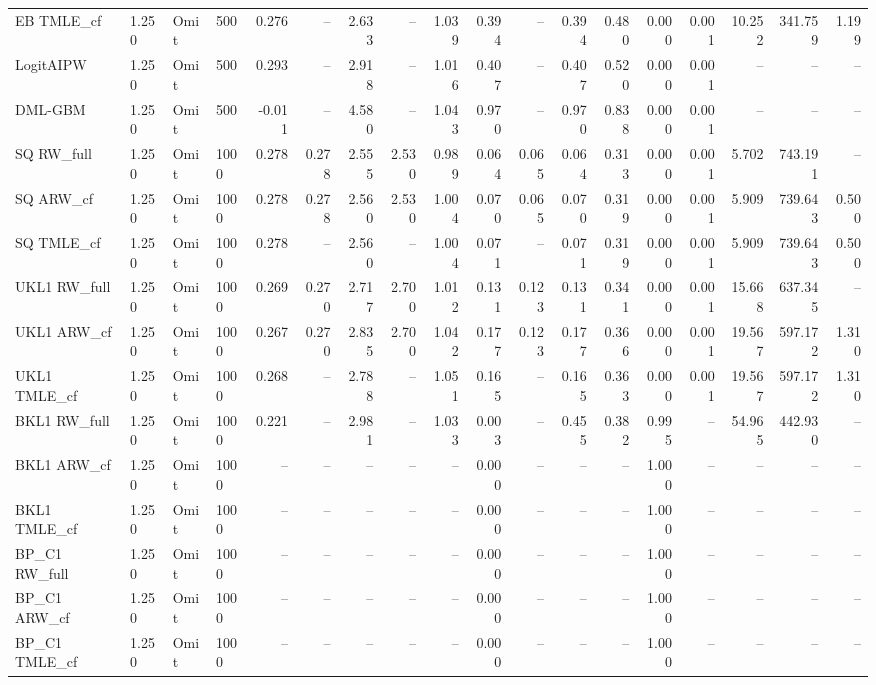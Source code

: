 \begin{tabular}{llllrrrrrrrrrrrrrr}
EB TMLE\_cf & 1.250 & Omit & 500 & 0.276 & -- & 2.633 & -- & 1.039 & 0.394 & -- & 0.394 & 0.480 & 0.000 & 0.001 & 10.252 & 341.759 & 1.199 \\
LogitAIPW & 1.250 & Omit & 500 & 0.293 & -- & 2.918 & -- & 1.016 & 0.407 & -- & 0.407 & 0.520 & 0.000 & 0.001 & -- & -- & -- \\
DML-GBM & 1.250 & Omit & 500 & -0.011 & -- & 4.580 & -- & 1.043 & 0.970 & -- & 0.970 & 0.838 & 0.000 & 0.001 & -- & -- & -- \\
SQ RW\_full & 1.250 & Omit & 1000 & 0.278 & 0.278 & 2.555 & 2.530 & 0.989 & 0.064 & 0.065 & 0.064 & 0.313 & 0.000 & 0.001 & 5.702 & 743.191 & -- \\
SQ ARW\_cf & 1.250 & Omit & 1000 & 0.278 & 0.278 & 2.560 & 2.530 & 1.004 & 0.070 & 0.065 & 0.070 & 0.319 & 0.000 & 0.001 & 5.909 & 739.643 & 0.500 \\
SQ TMLE\_cf & 1.250 & Omit & 1000 & 0.278 & -- & 2.560 & -- & 1.004 & 0.071 & -- & 0.071 & 0.319 & 0.000 & 0.001 & 5.909 & 739.643 & 0.500 \\
UKL1 RW\_full & 1.250 & Omit & 1000 & 0.269 & 0.270 & 2.717 & 2.700 & 1.012 & 0.131 & 0.123 & 0.131 & 0.341 & 0.000 & 0.001 & 15.668 & 637.345 & -- \\
UKL1 ARW\_cf & 1.250 & Omit & 1000 & 0.267 & 0.270 & 2.835 & 2.700 & 1.042 & 0.177 & 0.123 & 0.177 & 0.366 & 0.000 & 0.001 & 19.567 & 597.172 & 1.310 \\
UKL1 TMLE\_cf & 1.250 & Omit & 1000 & 0.268 & -- & 2.788 & -- & 1.051 & 0.165 & -- & 0.165 & 0.363 & 0.000 & 0.001 & 19.567 & 597.172 & 1.310 \\
BKL1 RW\_full & 1.250 & Omit & 1000 & 0.221 & -- & 2.981 & -- & 1.033 & 0.003 & -- & 0.455 & 0.382 & 0.995 & -- & 54.965 & 442.930 & -- \\
BKL1 ARW\_cf & 1.250 & Omit & 1000 & -- & -- & -- & -- & -- & 0.000 & -- & -- & -- & 1.000 & -- & -- & -- & -- \\
BKL1 TMLE\_cf & 1.250 & Omit & 1000 & -- & -- & -- & -- & -- & 0.000 & -- & -- & -- & 1.000 & -- & -- & -- & -- \\
BP\_C1 RW\_full & 1.250 & Omit & 1000 & -- & -- & -- & -- & -- & 0.000 & -- & -- & -- & 1.000 & -- & -- & -- & -- \\
BP\_C1 ARW\_cf & 1.250 & Omit & 1000 & -- & -- & -- & -- & -- & 0.000 & -- & -- & -- & 1.000 & -- & -- & -- & -- \\
BP\_C1 TMLE\_cf & 1.250 & Omit & 1000 & -- & -- & -- & -- & -- & 0.000 & -- & -- & -- & 1.000 & -- & -- & -- & -- \\

\end{tabular}

